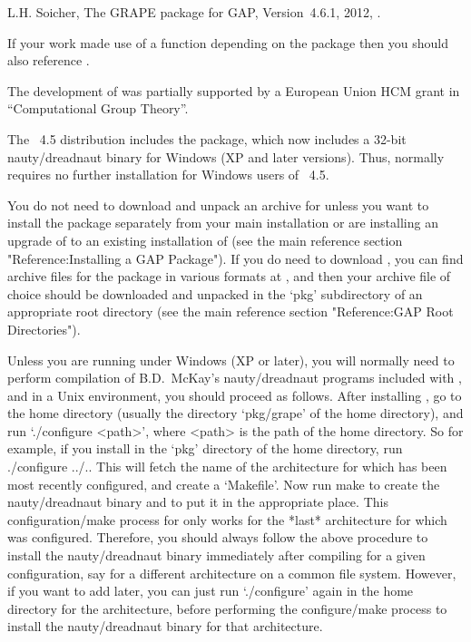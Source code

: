 L.H. Soicher, The {GRAPE} package for {GAP}, Version~4.6.1, 2012,
.

If your work made use of a function depending on the {\nauty} package
then you should also reference {\nauty} \cite{Nau90}.

The development of {\GRAPE} was partially supported by a European Union
HCM grant in ``Computational Group Theory''.


The {\GAP}~4.5 distribution includes the {\GRAPE} package, which now
includes a 32-bit nauty/dreadnaut binary for Windows (XP and later
versions).  Thus, {\GRAPE} normally requires no further installation
for Windows users of {\GAP}~4.5.

You do not need to download and unpack an archive for {\GRAPE}
unless you want to install the package separately from your main
{\GAP} installation or are installing an upgrade of {\GRAPE} to an
existing installation of {\GAP} (see the main {\GAP} reference section
"Reference:Installing a GAP Package").  If you do need to download
{\GRAPE}, you can find archive files for the package in various formats
at , and then your
archive file of choice should be downloaded and unpacked in the `pkg'
subdirectory of an appropriate {\GAP} root directory (see the main {\GAP}
reference section "Reference:GAP Root Directories").

Unless you are running {\GRAPE} under Windows (XP or later), you will
normally need to perform compilation of B.D.~McKay's nauty/dreadnaut
programs included with {\GRAPE}, and in a Unix environment, you should
proceed as follows.  After installing {\GAP}, go to the {\GRAPE}
home directory (usually the directory `pkg/grape' of the {\GAP} home
directory), and run `./configure <path>', where <path> is the path of the
{\GAP} home directory.  So for example, if you install {\GRAPE} in the
`pkg' directory of the {\GAP} home directory, run
\begintt
./configure ../..
\endtt
This will fetch the name of the architecture for which {\GAP} has been
most recently configured, and create a `Makefile'. Now run
\begintt
make 
\endtt
to create the nauty/dreadnaut binary and to put it in the appropriate
place.  This configuration/make process for {\GRAPE} only works for
the *last* architecture for which {\GAP} was configured. Therefore, you
should always follow the above procedure to install the nauty/dreadnaut
binary immediately after compiling {\GAP} for a given configuration,
say for a different architecture on a common file system. However, if
you want to add {\GRAPE} later, you can just run `./configure' again in
the {\GAP} home directory for the architecture, before performing the
{\GRAPE} configure/make process to install the nauty/dreadnaut binary
for that architecture.

